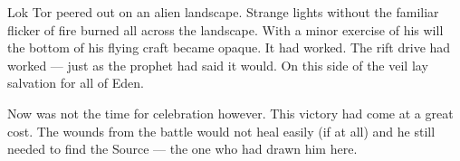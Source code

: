 
Lok Tor peered out on an alien landscape. Strange lights without the familiar
flicker of fire burned all across the landscape. With a minor exercise of his
will the bottom of his flying craft became opaque. It had worked. The rift
drive had worked --- just as the prophet had said it would. On this side of the
veil lay salvation for all of Eden.

Now was not the time for celebration however. This victory had come at a
great cost. The wounds from the battle would not heal easily (if at all) and he
still needed to find the Source --- the one who had drawn him here.

